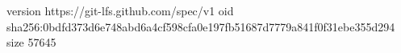 version https://git-lfs.github.com/spec/v1
oid sha256:0bdfd373d6e748abd6a4cf598cfa0e197fb51687d7779a841f0f31ebe355d294
size 57645
